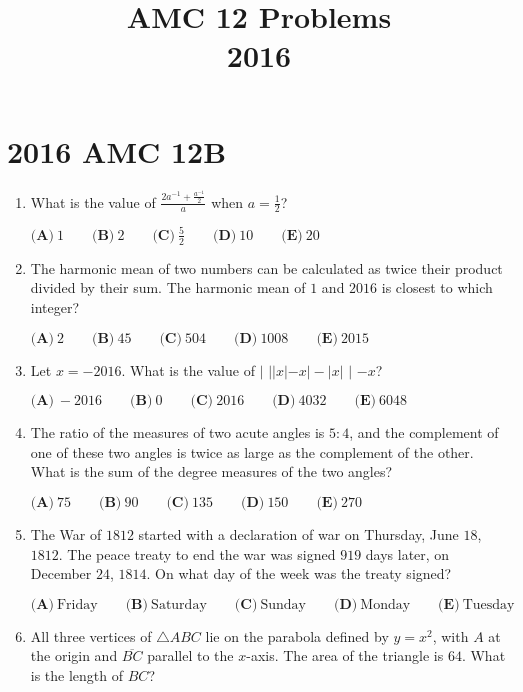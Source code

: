 \documentclass{article}
\title{AMC 12 Problems \\ 2016}
\date{}
\begin{document}
\maketitle\thispagestyle{fancy}\newpage\section*{2016 AMC 12B}\begin{enumerate}[label=\arabic*., itemsep=0.5em]\item What is the value of \(\frac{2a^{-1}+\frac{a^{-1}}{2}}{a}\) when \(a= \frac{1}{2}\)?

\(\textbf{(A)}\ 1\qquad\textbf{(B)}\ 2\qquad\textbf{(C)}\ \frac{5}{2}\qquad\textbf{(D)}\ 10\qquad\textbf{(E)}\ 20\)\par \vspace{0.5em}\item The harmonic mean of two numbers can be calculated as twice their product divided by their sum. The harmonic mean of \(1\) and \(2016\) is closest to which integer?

\(\textbf{(A)}\ 2 \qquad
\textbf{(B)}\ 45 \qquad
\textbf{(C)}\ 504 \qquad
\textbf{(D)}\ 1008 \qquad
\textbf{(E)}\ 2015 \)\par \vspace{0.5em}\item Let \(x=-2016\). What is the value of \(\bigg|\) \(||x|-x|-|x|\) \(\bigg|\) \(-x\)?

\(\textbf{(A)}\ -2016\qquad\textbf{(B)}\ 0\qquad\textbf{(C)}\ 2016\qquad\textbf{(D)}\ 4032\qquad\textbf{(E)}\ 6048\)\par \vspace{0.5em}\item The ratio of the measures of two acute angles is \(5:4\), and the complement of one of these two angles is twice as large as the complement of the other. What is the sum of the degree measures of the two angles?

\(\textbf{(A)}\ 75\qquad\textbf{(B)}\ 90\qquad\textbf{(C)}\ 135\qquad\textbf{(D)}\ 150\qquad\textbf{(E)}\ 270\)\par \vspace{0.5em}\item The War of \(1812\) started with a declaration of war on Thursday, June \(18\), \(1812\). The peace treaty to end the war was signed \(919\) days later, on December \(24\), \(1814\). On what day of the week was the treaty signed? 

\(\textbf{(A)}\ \text{Friday} \qquad
\textbf{(B)}\ \text{Saturday} \qquad
\textbf{(C)}\ \text{Sunday} \qquad
\textbf{(D)}\ \text{Monday} \qquad
\textbf{(E)}\ \text{Tuesday} \)\par \vspace{0.5em}\item All three vertices of \(\bigtriangleup ABC\) lie on the parabola defined by \(y=x^2\), with \(A\) at the origin and \(\overline{BC}\) parallel to the \(x\)-axis. The area of the triangle is \(64\). What is the length of \(BC\)?  


\end{enumerate}
\end{document}
